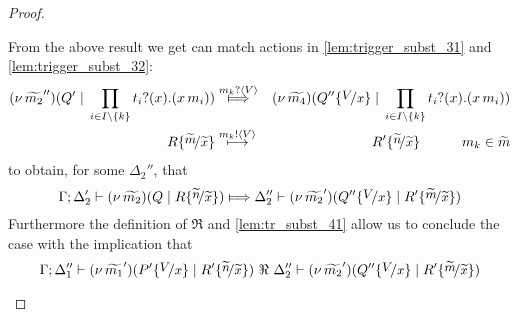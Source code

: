 \begin{proof}
\begin{enumerate}
\begin{enumerate}[i.]
							From the above result we get can
							match actions in \eqref{lem:trigger_subst_31}
							and \eqref{lem:trigger_subst_32}:
							\begin{eqnarray*}
								\newsp{\widetilde{m_2}''}{Q' \Par \prod_{i \in I\backslash{\set{k}}} \binp{t_i}{x} (\appl{x}{m_i})}
								&\Hby{\bactinp{m_k}{V}}&
								\newsp{\widetilde{m_4}}{Q'' \subst{V}{x} \Par \prod_{i \in I\backslash{\set{k}}} \binp{t_i}{x} (\appl{x}{m_i})}
								\\
								R \subst{\widetilde{m}}{\widetilde{x}}
								&\hby{\bactout{m_k}{V}}&
								R' \subst{\widetilde{n}}{\widetilde{x}} \qquad \quad m_k \in \widetilde{m}
							\end{eqnarray*}
							to obtain, for some $\Delta_2''$, that
							\[
								\horel{\Gamma}{\Delta_2'}{\newsp{\widetilde{m_2}}{Q \Par R \subst{\widetilde{n}}{\widetilde{x}} }}
								{\Hby{}}
								{\Delta_2''}{\newsp{\widetilde{m_2}'}{Q'' \subst{V}{x} \Par R' \subst{\widetilde{m}}{\widetilde{x}} }}
							\]
							Furthermore the definition of $\Re$ and \eqref{lem:tr_subst_41} allow us to
							conclude the case with the implication that
							\[
								\horel{\Gamma}{\Delta_1''}{\newsp{\widetilde{m_1}'}{P'\subst{V}{x} \Par R' \subst{\widetilde{n}}{\widetilde{x}} }}
								{\ \Re\ }
								{\Delta_2''}{\newsp{\widetilde{m_2}'}{Q'' \subst{V}{x} \Par R' \subst{\widetilde{m}}{\widetilde{x}} }}
							\]
			



\end{enumerate}
\end{enumerate}
\end{proof}
